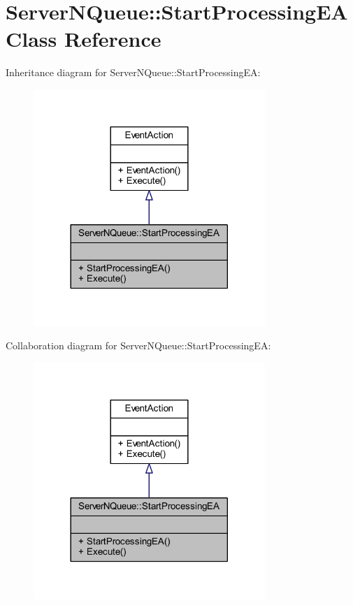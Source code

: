 \hypertarget{class_server_n_queue_1_1_start_processing_e_a}{}\section{Server\+N\+Queue\+:\+:Start\+Processing\+EA Class Reference}
\label{class_server_n_queue_1_1_start_processing_e_a}


Inheritance diagram for Server\+N\+Queue\+:\+:Start\+Processing\+EA\+:\nopagebreak
\begin{figure}[H]
\begin{center}
\leavevmode
\includegraphics[width=248pt]{class_server_n_queue_1_1_start_processing_e_a__inherit__graph}
\end{center}
\end{figure}


Collaboration diagram for Server\+N\+Queue\+:\+:Start\+Processing\+EA\+:\nopagebreak
\begin{figure}[H]
\begin{center}
\leavevmode
\includegraphics[width=248pt]{class_server_n_queue_1_1_start_processing_e_a__coll__graph}
\end{center}
\end{figure}
